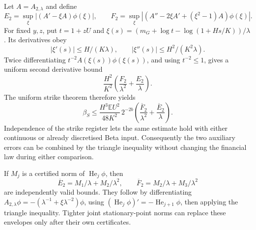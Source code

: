 Let $A=A_{2,\lambda}$ and define
\[
 E_2=\sup_\xi|(A'-\xi A)\phi(\xi)|,\qquad
 F_2=\sup_\xi|
 (A''-2\xi A'+(\xi^2-1)A)\phi(\xi)|.
\]
For fixed $y,z$, put $t=1+zU$ and
$\xi(s)=(m_G+\log t-\log(1+Hs/K))/\lambda$.
Its derivatives obey
\[
 |\xi'(s)|\leq H/(K\lambda),\qquad
 |\xi''(s)|\leq H^2/(K^2\lambda).
\]
Twice differentiating $t^{-2}A(\xi(s))\phi(\xi(s))$, and using
$t^{-2}\leq1$, gives a uniform second derivative bound
\[
 \frac{H^2}{K^2}
 \left(\frac{F_2}{\lambda^2}+\frac{E_2}{\lambda}\right).
\]
The uniform strike theorem therefore yields
\[
 \beta_S\leq
 \frac{H^3\mathbb E U^2}{48K^2}\,2^{-2b}
 \left(\frac{\overline F_2}{\lambda^2}
      +\frac{\overline E_2}{\lambda}\right).
\]
Independence of the strike register lets the same estimate hold with
either continuous or already discretised Beta input. Consequently the
two auxiliary errors can be combined by the triangle inequality without
changing the financial law during either comparison.

If $M_j$ is a certified norm of $\operatorname{He}_j\phi$, then
\[
 \overline E_2=M_1/\lambda+M_2/\lambda^2,\qquad
 \overline F_2=M_2/\lambda+M_3/\lambda^2
\]
are independently valid bounds. They follow by differentiating
$A_{2,\lambda}\phi=-(\lambda^{-1}+\xi\lambda^{-2})\phi$,
using $(\operatorname{He}_j\phi)'=-\operatorname{He}_{j+1}\phi$,
then applying the triangle inequality. Tighter joint stationary-point
norms can replace these envelopes only after their own certificates.
